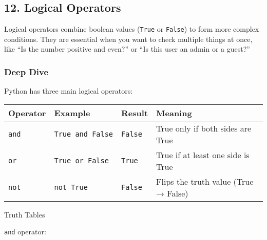 \documentclass[
  letterpaper,
  DIV=11,
  numbers=noendperiod]{scrreprt}
\begin{document}
\subsection{12. Logical Operators}\label{logical-operators}

Logical operators combine boolean values (\texttt{True} or
\texttt{False}) to form more complex conditions. They are essential when
you want to check multiple things at once, like ``Is the number positive
and even?'' or ``Is this user an admin or a guest?''

\subsubsection{Deep Dive}\label{deep-dive-12}

Python has three main logical operators:

\begin{longtable}[]{@{}
  >{\raggedright\arraybackslash}p{}
  >{\raggedright\arraybackslash}p{}
  >{\raggedright\arraybackslash}p{}
  >{\raggedright\arraybackslash}p{}@{}}
\toprule\noalign{}
\begin{minipage}[b]{\linewidth}\raggedright
Operator
\end{minipage} & \begin{minipage}[b]{\linewidth}\raggedright
Example
\end{minipage} & \begin{minipage}[b]{\linewidth}\raggedright
Result
\end{minipage} & \begin{minipage}[b]{\linewidth}\raggedright
Meaning
\end{minipage} \\
\midrule\noalign{}
\endhead
\bottomrule\noalign{}
\endlastfoot
\texttt{and} & \texttt{True\ and\ False} & \texttt{False} & True only if
both sides are True \\
\texttt{or} & \texttt{True\ or\ False} & \texttt{True} & True if at
least one side is True \\
\texttt{not} & \texttt{not\ True} & \texttt{False} & Flips the truth
value (True → False) \\
\end{longtable}

Truth Tables

\texttt{and} operator:
\end{document}
